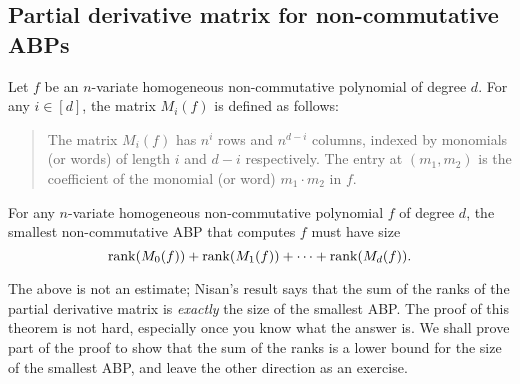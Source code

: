 \subsection{Partial derivative matrix for non-commutative ABPs}

\begin{definition} Let $f$ be an $n$-variate homogeneous non-commutative
    polynomial of degree $d$. For any $i \in [d]$, the matrix $M_i(f)$ is defined as follows:
  \begin{quote}
    The matrix $M_i(f)$ has $n^i$ rows and $n^{d-i}$ columns, indexed by monomials (or words) of length $i$ and $d-i$ respectively. The entry at $(m_1, m_2)$ is the coefficient of the monomial (or word) $m_1 \cdot m_2$ in $f$. \qedhere
  \end{quote}
\end{definition}

\begin{theorem}\label{thm:nis-noncomm-abp}
For any $n$-variate homogeneous non-commutative polynomial $f$ of degree $d$, the smallest non-commutative ABP that computes $f$ must have size
\[
\operatorname{rank}(M_0(f)) + \operatorname{rank}(M_1(f)) +  \cdots + \operatorname{rank}(M_{d}(f)).
\]
\end{theorem}
The above is not an estimate; Nisan's result says that the sum of the ranks of the partial derivative matrix is \emph{exactly} the size of the smallest ABP.
The proof of this theorem is not hard, especially once you know what the answer is.
We shall prove part of the proof to show that the sum of the ranks is a lower bound for the size of the smallest ABP, and leave the other direction as an exercise.

